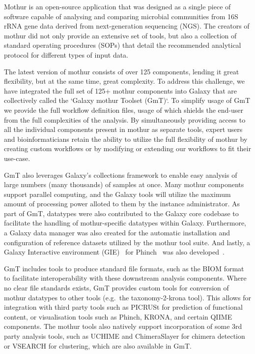 Mothur is an open-source application that was designed as a single piece of software capable of analysing and comparing microbial communities from 16S rRNA gene data derived from next-generation sequencing (NGS). The creators of mothur did not only provide an extensive set of tools, but also a collection of standard operating procedures (SOPs) that detail the recommended analytical protocol for different types of input data.

The latest version of mothur consists of over 125 components, lending it great flexibility, but at the same time, great complexity. To address this challenge, we have integrated the full set of 125+ mothur components into Galaxy that are collectively called the `Galaxy mothur Toolset (GmT)`. To simplify usage of GmT we provide the full workflow definition files, usage of which shields the end-user from the full complexities of the analysis. By simultaneously providing access to all the individual components present in mothur as separate tools, expert users and bioinformaticians retain the ability to utilize the full flexibility of mothur by creating custom workflows or by modifying or extending our workflows to fit their use-case.

GmT also leverages Galaxy's collections framework to enable easy analysis of large numbers (many thousands) of samples at once. Many mothur components support parallel computing, and the Galaxy tools will utilize the maximum amount of processing power alloted to them by the instance administrator. As part of GmT, datatypes were also contributed to the Galaxy core codebase to facilitate the handling of mothur-specific datatypes within Galaxy. Furthermore, a Galaxy data manager was also created for the automatic installation and configuration of reference datasets utilized by the mothur tool suite. And lastly, a Galaxy Interactive environment (GIE)~\cite{helena2015galaxy} for Phinch~\cite{bik2014phinch} was also developed~\cite{phinchGIE}.

GmT includes tools to produce standard file formats, such as the BIOM format~\cite{biom-format} to facilitate interoperability with these downstream analysis components. Where no clear file standards exists, GmT provides custom tools for conversion of mothur datatypes to other tools (e.g.\ the taxonomy-2-krona tool). This allows for integration with third party tools such as PICRUSt for prediction of functional content, or visualisation tools such as Phinch, KRONA, and certain QIIME components. The mothur tools also natively support incorporation of some 3rd party analysis tools, such as UCHIME and ChimeraSlayer for chimera detection or VSEARCH for clustering, which are also available in GmT.

